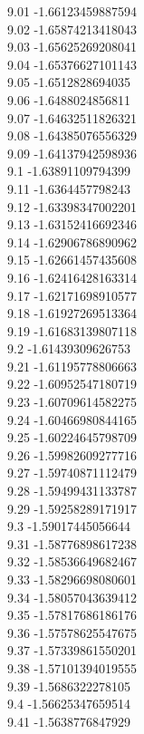 {9.01	-1.66123459887594\\
9.02	-1.65874213418043\\
9.03	-1.65625269208041\\
9.04	-1.65376627101143\\
9.05	-1.6512828694035\\
9.06	-1.6488024856811\\
9.07	-1.64632511826321\\
9.08	-1.64385076556329\\
9.09	-1.64137942598936\\
9.1	-1.63891109794399\\
9.11	-1.6364457798243\\
9.12	-1.63398347002201\\
9.13	-1.63152416692346\\
9.14	-1.62906786890962\\
9.15	-1.62661457435608\\
9.16	-1.62416428163314\\
9.17	-1.62171698910577\\
9.18	-1.61927269513364\\
9.19	-1.61683139807118\\
9.2	-1.61439309626753\\
9.21	-1.61195778806663\\
9.22	-1.60952547180719\\
9.23	-1.60709614582275\\
9.24	-1.60466980844165\\
9.25	-1.60224645798709\\
9.26	-1.59982609277716\\
9.27	-1.59740871112479\\
9.28	-1.59499431133787\\
9.29	-1.59258289171917\\
9.3	-1.59017445056644\\
9.31	-1.58776898617238\\
9.32	-1.58536649682467\\
9.33	-1.58296698080601\\
9.34	-1.58057043639412\\
9.35	-1.57817686186176\\
9.36	-1.57578625547675\\
9.37	-1.57339861550201\\
9.38	-1.57101394019555\\
9.39	-1.5686322278105\\
9.4	-1.56625347659514\\
9.41	-1.5638776847929\\
}
